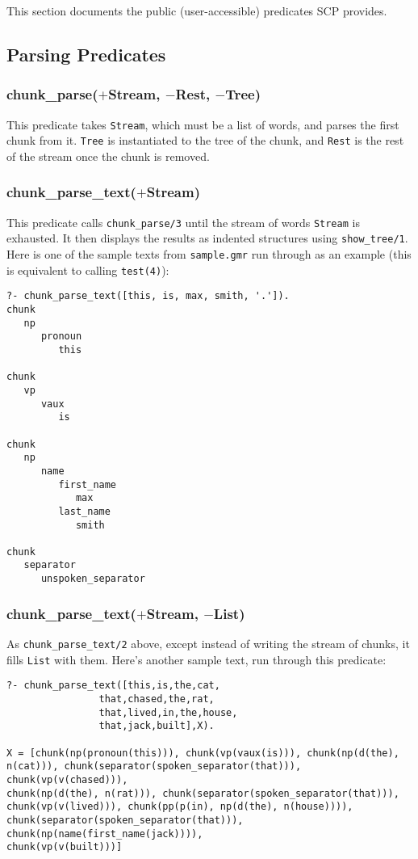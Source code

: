 \documentclass[12pt]{article}
\begin{document}
This section documents the public (user-accessible) predicates SCP provides.

\subsection{Parsing Predicates}

\subsubsection*{chunk\_parse($+$Stream, $-$Rest, $-$Tree)}

This predicate takes \verb+Stream+, which must be a list of words, and parses the first chunk from it.  \verb+Tree+ is instantiated to the tree of the chunk, and \verb+Rest+ is the rest of the stream once the chunk is removed.

\subsubsection*{chunk\_parse\_text($+$Stream)}

This predicate calls \verb+chunk_parse/3+ until the stream of words \verb+Stream+ is exhausted.  It then displays the results as indented structures using \verb+show_tree/1+.  Here is one of the sample texts from \verb+sample.gmr+ run through as an example (this is equivalent to calling \verb+test(4)+):
\begin{verbatim}
?- chunk_parse_text([this, is, max, smith, '.']).
chunk
   np
      pronoun
         this

chunk
   vp
      vaux
         is

chunk
   np
      name
         first_name
            max
         last_name
            smith

chunk
   separator
      unspoken_separator
\end{verbatim}

\subsubsection*{chunk\_parse\_text($+$Stream, $-$List)}

As \verb+chunk_parse_text/2+ above, except instead of writing the stream of chunks, it fills \verb+List+ with them.  Here's another sample text, run through this predicate:
\begin{verbatim}
?- chunk_parse_text([this,is,the,cat,
                that,chased,the,rat,
                that,lived,in,the,house,
                that,jack,built],X).

X = [chunk(np(pronoun(this))), chunk(vp(vaux(is))), chunk(np(d(the),
n(cat))), chunk(separator(spoken_separator(that))), chunk(vp(v(chased))),
chunk(np(d(the), n(rat))), chunk(separator(spoken_separator(that))),
chunk(vp(v(lived))), chunk(pp(p(in), np(d(the), n(house)))),
chunk(separator(spoken_separator(that))), chunk(np(name(first_name(jack)))),
chunk(vp(v(built)))]
\end{verbatim}
\end{document}
